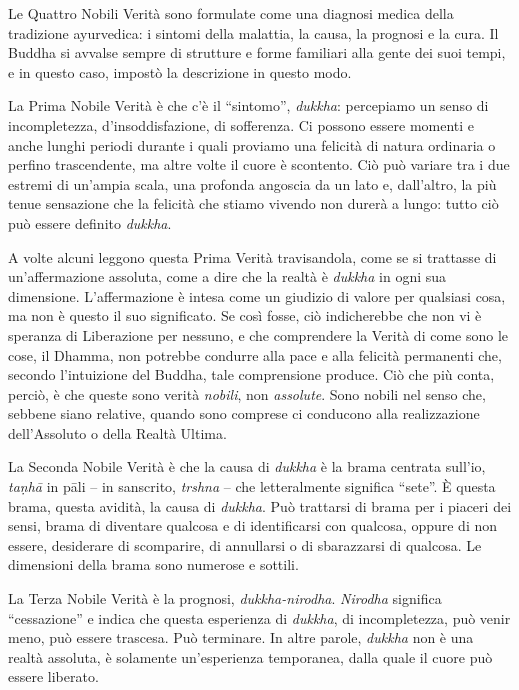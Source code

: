 Le Quattro Nobili Verità sono formulate come una diagnosi medica della
tradizione ayurvedica: i sintomi della malattia, la causa, la prognosi e
la cura. Il Buddha si avvalse sempre di strutture e forme familiari alla
gente dei suoi tempi, e in questo caso, impostò la descrizione in questo
modo.

La Prima Nobile Verità è che c'è il ``sintomo'', \emph{dukkha}:
percepiamo un senso di incompletezza, d'insoddisfazione, di sofferenza.
Ci possono essere momenti e anche lunghi periodi durante i quali
proviamo una felicità di natura ordinaria o perfino trascendente, ma
altre volte il cuore è scontento. Ciò può variare tra i due estremi di
un'ampia scala, una profonda angoscia da un lato e, dall'altro, la più
tenue sensazione che la felicità che stiamo vivendo non durerà a lungo:
tutto ciò può essere definito \emph{dukkha}.

A volte alcuni leggono questa Prima Verità travisandola, come se si
trattasse di un'affermazione assoluta, come a dire che la realtà è
\emph{dukkha} in ogni sua dimensione. L'affermazione è intesa come un
giudizio di valore per qualsiasi cosa, ma non è questo il suo
significato. Se così fosse, ciò indicherebbe che non vi è speranza di
Liberazione per nessuno, e che comprendere la Verità di come sono le
cose, il Dhamma, non potrebbe condurre alla pace e alla felicità
permanenti che, secondo l'intuizione del Buddha, tale comprensione
produce. Ciò che più conta, perciò, è che queste sono verità
\emph{nobili}, non \emph{assolute}. Sono nobili nel senso che, sebbene
siano relative, quando sono comprese ci conducono alla realizzazione
dell'Assoluto o della Realtà Ultima.

La Seconda Nobile Verità è che la causa di \emph{dukkha} è la brama
centrata sull'io, \emph{taṇhā} in pāli -- in sanscrito, \emph{trshna} --
che letteralmente significa ``sete''. È questa brama, questa avidità, la
causa di \emph{dukkha}. Può trattarsi di brama per i piaceri dei sensi,
brama di diventare qualcosa e di identificarsi con qualcosa, oppure di
non essere, desiderare di scomparire, di annullarsi o di sbarazzarsi di
qualcosa. Le dimensioni della brama sono numerose e sottili.

La Terza Nobile Verità è la prognosi, \emph{dukkha-nirodha}.
\emph{Nirodha} significa ``cessazione'' e indica che questa esperienza
di \emph{dukkha}, di incompletezza, può venir meno, può essere trascesa.
Può terminare. In altre parole, \emph{dukkha} non è una realtà assoluta,
è solamente un'esperienza temporanea, dalla quale il cuore può essere
liberato.

